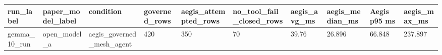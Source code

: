 \begin{tabular}{llllllllll}
 \hline
run\_label & paper\_model\_label & condition & governed\_rows & aegis\_attempted\_rows & no\_tool\_fail\_closed\_rows & aegis\_avg\_ms & aegis\_median\_ms & Aegis p95 ms & aegis\_max\_ms \\
 \hline
gemma\_10\_run & open\_model\_a & aegis\_governed\_mesh\_agent & 420 & 350 & 70 & 39.76 & 26.896 & 66.848 & 237.897 \\
 \hline
\end{tabular}

